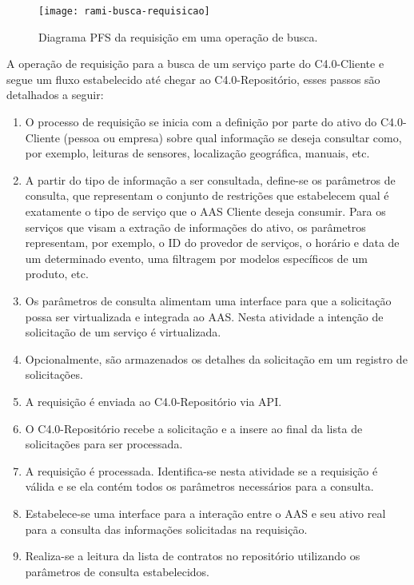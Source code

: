 \begin{figure}[htb]
	\centering
	\texttt{[image: rami-busca-requisicao]}
	\caption{Diagrama PFS da requisição em uma operação de busca.}
	\label{fig:rami-busca-requisicao}
\end{figure}

A operação de requisição para a busca de um serviço parte do C4.0-Cliente e segue um fluxo estabelecido até chegar ao C4.0-Repositório, esses passos são detalhados a seguir:

\begin{enumerate}

	\item O processo de requisição se inicia com a definição por parte do ativo do C4.0-Cliente (pessoa ou empresa) sobre qual informação se deseja consultar como, por exemplo, leituras de sensores, localização geográfica, manuais, etc.

	\item A partir do tipo de informação a ser consultada, define-se os parâmetros de consulta, que representam o conjunto de restrições que estabelecem qual é exatamente o tipo de serviço que o AAS Cliente deseja consumir. Para os serviços que visam a extração de informações do ativo, os parâmetros representam, por exemplo, o ID do provedor de serviços, o horário e data de um determinado evento, uma filtragem por modelos específicos de um produto, etc.

	\item Os parâmetros de consulta alimentam uma interface para que a solicitação possa ser virtualizada e integrada ao AAS. Nesta atividade a intenção de solicitação de um serviço é virtualizada.

	\item Opcionalmente, são armazenados os detalhes da solicitação em um registro de solicitações.

	\item A requisição é enviada ao C4.0-Repositório via API.

	\item O C4.0-Repositório recebe a solicitação e a insere ao final da lista de solicitações para ser processada.

	\item A requisição é processada. Identifica-se nesta atividade se a requisição é válida e se ela contém todos os parâmetros necessários para a consulta.

	\item Estabelece-se uma interface para a interação entre o AAS e seu ativo real para a consulta das informações solicitadas na requisição.

	\item Realiza-se a leitura da lista de contratos no repositório utilizando os parâmetros de consulta estabelecidos.

\end{enumerate}

